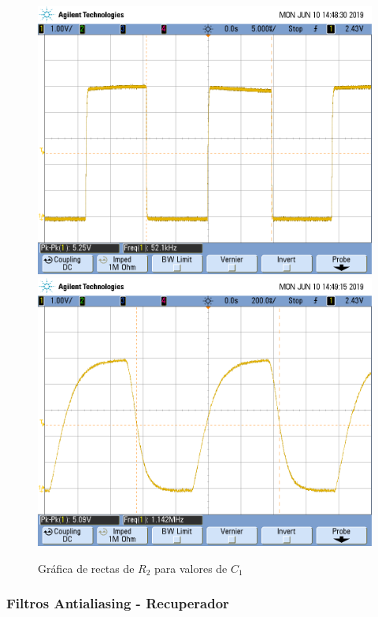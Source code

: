 \documentclass[assd_tp3_main.tex]{subfiles}
\begin{document}
\begin{figure}[!ht]
\begin{centering}
\includegraphics[scale=0.2]{../EJ4/Mediciones/Clk/clk_min.png}
\includegraphics[scale=0.2]{../EJ4/Mediciones/Clk/clk_max.png}
\par\end{centering}
\caption{Gráfica de rectas de $R_2$ para valores de $C_1$}
\end{figure}

\subsubsection{Filtros Antialiasing - Recuperador}
\end{document}
